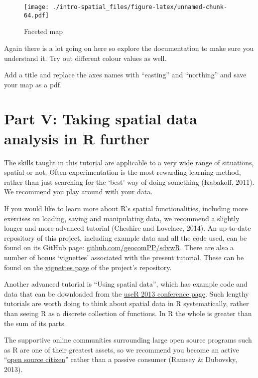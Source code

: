 \documentclass[]{article}
\begin{document}
\begin{figure}[htbp]
\centering
\texttt{[image: ./intro-spatial\_files/figure-latex/unnamed-chunk-64.pdf]}
\caption{Faceted map}
\end{figure}

Again there is a lot going on here so explore the documentation to make
sure you understand it. Try out different colour values as well.

Add a title and replace the axes names with ``easting'' and ``northing''
and save your map as a pdf.

\section{Part V: Taking spatial data analysis in R
further}\label{part-v-taking-spatial-data-analysis-in-r-further}

The skills taught in this tutorial are applicable to a very wide range
of situations, spatial or not. Often experimentation is the most
rewarding learning method, rather than just searching for the `best' way
of doing something (Kabakoff, 2011). We recommend you play around with
your data.

If you would like to learn more about R's spatial functionalities,
including more exercises on loading, saving and manipulating data, we
recommend a slightly longer and more advanced tutorial (Cheshire and
Lovelace, 2014). An up-to-date repository of this project, including
example data and all the code used, can be found on its GitHub page:
\href{https://github.com/geocomPP/sdvwR}{github.com/geocomPP/sdvwR}.
There are also a number of bonus `vignettes' associated with the present
tutorial. These can be found on the
\href{https://github.com/Robinlovelace/Creating-maps-in-R/tree/master/vignettes}{vignettes
page} of the project's repository.

Another advanced tutorial is ``Using spatial data'', which has example
code and data that can be downloaded from the
\href{http://www.edii.uclm.es/~useR-2013//Tutorials/Bivand.html}{useR
2013 conference page}. Such lengthy tutorials are worth doing to think
about spatial data in R systematically, rather than seeing R as a
discrete collection of functions. In R the whole is greater than the sum
of its parts.

The supportive online communities surrounding large open source programs
such as R are one of their greatest assets, so we recommend you become
an active
``\href{http://blog.cleverelephant.ca/2013/10/being-open-source-citizen.html}{open
source citizen}'' rather than a passive consumer (Ramsey \& Dubovsky,
2013).
\end{document}

